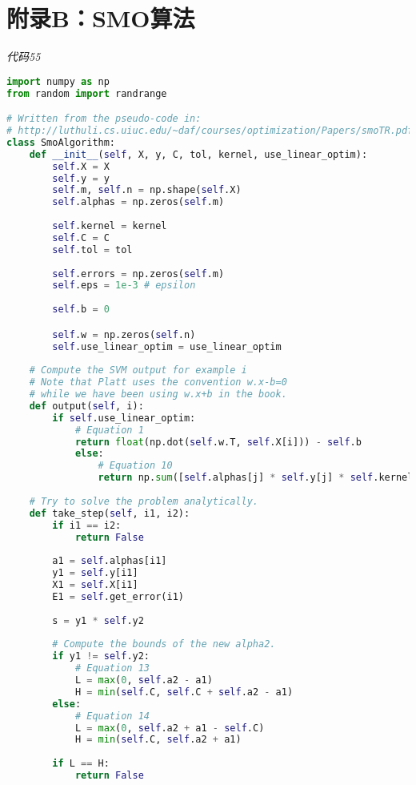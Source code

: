 \chapter{附录B：SMO算法}

\emph{代码55}

\begin{lstlisting}[language=python]
import numpy as np 
from random import randrange 

# Written from the pseudo-code in: 
# http://luthuli.cs.uiuc.edu/~daf/courses/optimization/Papers/smoTR.pdf 
class SmoAlgorithm: 
    def __init__(self, X, y, C, tol, kernel, use_linear_optim): 
        self.X = X 
        self.y = y 
        self.m, self.n = np.shape(self.X) 
        self.alphas = np.zeros(self.m) 
        
        self.kernel = kernel 
        self.C = C 
        self.tol = tol 
        
        self.errors = np.zeros(self.m) 
        self.eps = 1e-3 # epsilon 
        
        self.b = 0 

        self.w = np.zeros(self.n) 
        self.use_linear_optim = use_linear_optim 
        
    # Compute the SVM output for example i 
    # Note that Platt uses the convention w.x-b=0 
    # while we have been using w.x+b in the book. 
    def output(self, i): 
        if self.use_linear_optim: 
            # Equation 1 
            return float(np.dot(self.w.T, self.X[i])) - self.b 
            else: 
                # Equation 10 
                return np.sum([self.alphas[j] * self.y[j] * self.kernel(self.X[j], self.X[i]) for j in range(self.m)]) - self.b 
                
    # Try to solve the problem analytically. 
    def take_step(self, i1, i2):
        if i1 == i2: 
            return False 
            
        a1 = self.alphas[i1] 
        y1 = self.y[i1] 
        X1 = self.X[i1] 
        E1 = self.get_error(i1) 
        
        s = y1 * self.y2 
        
        # Compute the bounds of the new alpha2. 
        if y1 != self.y2: 
            # Equation 13 
            L = max(0, self.a2 - a1) 
            H = min(self.C, self.C + self.a2 - a1) 
        else: 
            # Equation 14 
            L = max(0, self.a2 + a1 - self.C) 
            H = min(self.C, self.a2 + a1) 
            
        if L == H: 
            return False 
            

\end{lstlisting}
